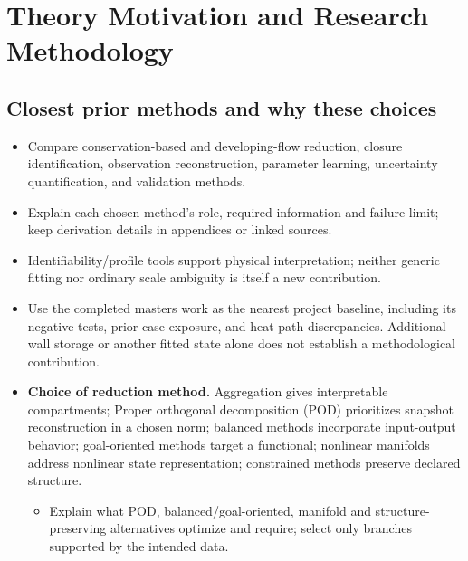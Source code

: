 \section{Theory Motivation and Research Methodology}\label{sec:theory-motivation-and-research-methodology}

\subsection{Closest prior methods and why these choices}\label{subsec:closest-prior-methods-and-why-these-choices}

\begin{itemize}[leftmargin=*]
\item Compare conservation-based and developing-flow reduction, closure identification, observation reconstruction, parameter learning, uncertainty quantification, and validation methods.
\item Explain each chosen method's role, required information and failure limit; keep derivation details in appendices or linked sources.
\item Identifiability/\allowbreak{}profile tools support physical interpretation; neither generic fitting nor ordinary scale ambiguity is itself a new contribution.\cite{raue2009identifiability}
\item Use the completed master\textquotesingle{}s work as the nearest project baseline, including its negative tests, prior case exposure, and heat-path discrepancies. Additional wall storage or another fitted state alone does not establish a methodological contribution.\cite{fierro2026cfdoneD}

\item {}\textbf{Choice of reduction method.} Aggregation gives interpretable compartments; Proper orthogonal decomposition (POD) prioritizes snapshot reconstruction in a chosen norm; balanced methods incorporate input-output behavior; goal-oriented methods target a functional; nonlinear manifolds address nonlinear state representation; constrained methods preserve declared structure.
\begin{itemize}
\item Explain what POD, balanced/\allowbreak{}goal-oriented, manifold and structure-preserving alternatives optimize and require; select only branches supported by the intended data.
\end{itemize}
\end{itemize}

